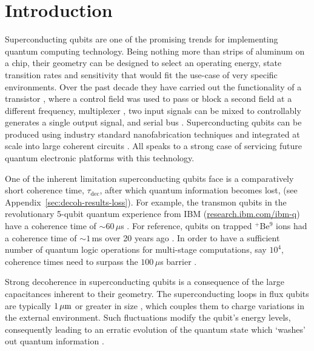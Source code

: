 
\section{Introduction}

\noindent Superconducting qubits are one of the promising trends for implementing
quantum computing  technology. Being nothing  more than  strips of aluminum  on a
chip,  their geometry  can  be  designed to  select  an  operating energy,  state
transition rates  and sensitivity that  would fit  the use-case of  very specific
environments.  Over the past decade they  have carried out the functionality of a
transistor \cite{Astafiev2010, hoi2011},  where a control field was  used to pass
or block a second field  at a different frequency, multiplexer \cite{honigl2018},
two input signals can be mixed  to controllably generates a single output signal,
and serial  bus \cite{shen2005}.   Superconducting qubits  can be  produced using
industry standard nanofabrication  techniques and integrated at  scale into large
coherent circuits \cite{johnson2010}.   All speaks to a strong  case of servicing
future quantum electronic platforms with this technology.

One of  the inherent  limitation superconducting qubits  face is  a comparatively
short coherence  time, $\tau_{\text{dec}}$, after which  quantum information becomes
lost,  (see Appendix~\ref{sec:decoh-results-loss}).   For  example, the  transmon
qubits   in    the   revolutionary   5-qubit   quantum    experience   from   IBM
(\href{http://www.research.ibm.com/ibm-q}{research.ibm.com/ibm-q})     have     a
coherence  time of  $  \sim 60\,\mu  $s \cite{linke2017}.   For  reference, qubits  on
trapped $ ^{+} $Be$  ^{9} $ ions had a coherence time of  $\sim1\, $ms over 20 years
ago \cite{monroe1995}.   In order to  have a  sufficient number of  quantum logic
operations for  multi-stage computations, say $  10^4 $, coherence times  need to
surpass the $ 100\,\mu$s barrier \cite{orlando1999}.

Strong  decoherence in  superconducting  qubits  is a  consequence  of the  large
capacitances  inherent to  their  geometry.  The  superconducting  loops in  flux
qubits   are    typically   $   1\,\mu\text{m}$   or    greater   in   size
\cite{Astafiev2010,  hoi2011,   johnson2010},  which   couples  them   to  charge
variations in  the external  environment.  Such  fluctuations modify  the qubit's
energy levels, consequently leading to an  erratic evolution of the quantum state
which `washes' out quantum information \cite{devoret2008}.
 
